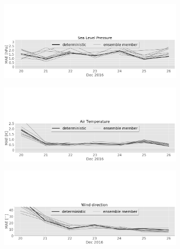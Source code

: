 \begin{figure}[H]%
		\centering
        \begin{subfigure}[b]{0.8\textwidth}
			\includegraphics[trim={0cm 0cm 0cm 9.5cm},clip,width=\textwidth]{./fig_sfc_pressure/MAE_20161220_26_00}
			\caption{}\label{fig:MAE:pres}
		\end{subfigure}
        \begin{subfigure}[b]{0.8\textwidth}
			\includegraphics[trim={0cm 0cm 0cm 9.5cm},clip,width=\textwidth]{./fig_sfc_temp/MAE_20161220_26_00}
			\caption{}\label{fig:MAE:temp}
		\end{subfigure}
        \begin{subfigure}[b]{0.75\textwidth}
			\includegraphics[trim={0cm 0cm 0cm 9.5cm},clip,width=\textwidth]{./fig_sfc_wd/MAE_20161220_26_00}
			\caption{}\label{fig:MAE:wd}

\end{subfigure}
\end{figure}
